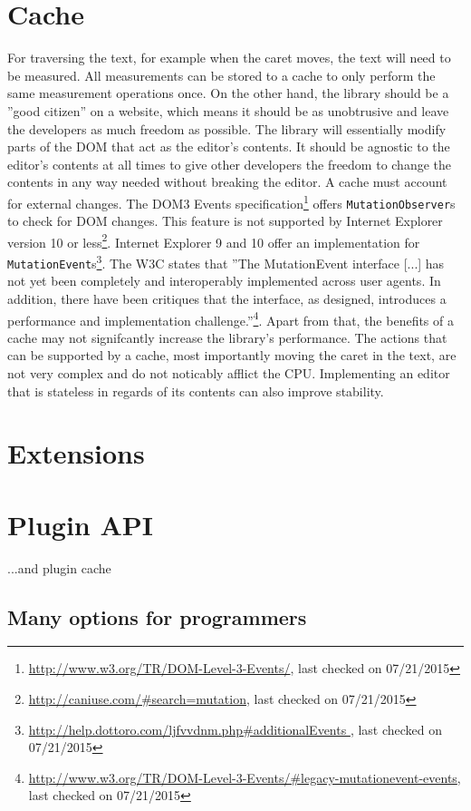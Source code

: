 \section{Cache} For traversing the text, for example when the caret moves, the text will need to be measured. All measurements can be stored to a cache to only perform the same measurement operations once. On the other hand, the library should be a ''good citizen'' on a website, which means it should be as unobtrusive and leave the developers as much freedom as possible. The library will essentially modify parts of the DOM that act as the editor's contents. It should be agnostic to the editor's contents at all times to give other developers the freedom to change the contents in any way needed without breaking the editor. A cache must account for external changes. The DOM3 Events specification\footnote{\url{http://www.w3.org/TR/DOM-Level-3-Events/}, last checked on 07/21/2015} offers \texttt{MutationObserver}s to check for DOM changes. This feature is not supported by Internet Explorer version 10 or less\footnote{\url{http://caniuse.com/\#search=mutation}, last checked on 07/21/2015}. Internet Explorer 9 and 10 offer an implementation for \texttt{MutationEvent}s\footnote{\url{http://help.dottoro.com/ljfvvdnm.php\#additionalEvents }, last checked on 07/21/2015}. The W3C states that ''The MutationEvent interface [...] has not yet been completely and interoperably implemented across user agents. In addition, there have been critiques that the interface, as designed, introduces a performance and implementation challenge.''\footnote{\url{http://www.w3.org/TR/DOM-Level-3-Events/\#legacy-mutationevent-events}, last checked on 07/21/2015}. Apart from that, the benefits of a cache may not signifcantly increase the library's performance. The actions that can be supported by a cache, most importantly moving the caret in the text, are not very complex and do not noticably afflict the CPU. Implementing an editor that is stateless in regards of its contents can also improve stability.

\section{Extensions}
\label{sec:extensions}

\section{Plugin API} ...and plugin cache

\subsection{Many options for programmers}

